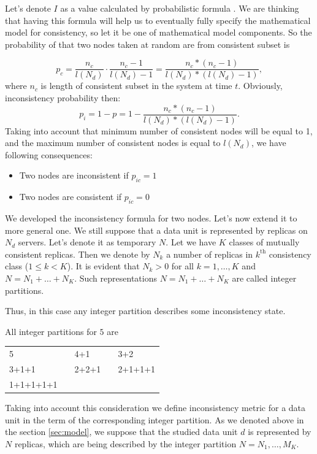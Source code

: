 \documentclass{llncs}
\begin{document}
Let's denote  $I$ as a value calculated by probabilistic formula .
We are thinking that having this formula will help us to eventually fully specify the mathematical model for consistency, so let it be one of mathematical model components.
So the probability of that two nodes taken at random are from consistent subset is

\[p_c = \frac{n_c}{l(N_d)} \cdot \frac{n_c - 1}{l(N_d) - 1} = \frac{n_c * (n_c - 1)}{l(N_d)* (l(N_d) -1)},\]
 where $n_c$ is length of consistent subset in the system at time $t$.
Obviously, inconsistency probability then:
\[p_{i} = 1 - p = 1 - \frac{n_c * (n_c - 1)}{l(N_d)* (l(N_d) -1)}.\]
Taking into account that minimum number of consistent nodes will be equal to 1, and the maximum number of consistent nodes is equal to $l(N_d)$, we have following consequences:
\begin{itemize}
\item Two nodes are inconsistent if  $p_{ic} = 1$
\item Two nodes are consistent if $p_{ic} = 0$ 
\end{itemize}

We developed the inconsistency formula for two nodes. Let's now extend it to more general one.
We still suppose that a data unit is represented by replicas on $N_d$ servers. Let's denote it as temporary $N$.
Let we have $K$ classes of mutually consistent replicas.
Then we denote by $N_k$ a number of replicas in $k^\mathrm{th}$ consistency class ($1\leq k<K$).
It is evident that $N_k>0$ for all $k=1,\ldots,K$ and $N=N_1+\ldots+N_K$.
Such representations $N=N_1+\ldots+N_K$ are called integer partitions.


\noindent Thus, in this case any integer partition describes some inconsistency state.

\begin{example}\label{ex:partitions}
All integer partitions for $5$ are
\begin{center}
\begin{tabular}{lclcl}
	5 & & 4+1 & & 3+2\\
	3+1+1 &\hspace*{10pt}& 2+2+1 &\hspace*{10pt}& 2+1+1+1\\
	1+1+1+1+1
\end{tabular}
\end{center}
\end{example}

Taking into account this consideration we define inconsistency metric for a data unit in the term of the corresponding integer partition.
As we denoted above  in the section \ref{sec:model}, we suppose that the studied data unit $d$ is represented by $N$ replicas, which are being described by the integer partition $N=N_1,\ldots,M_K$.
\end{document}
